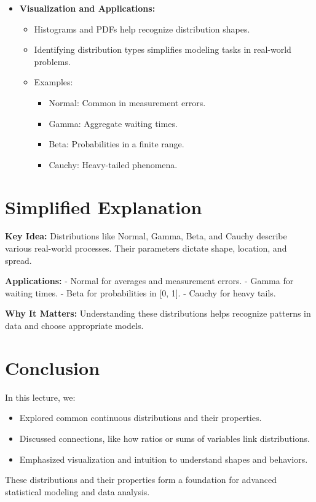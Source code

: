 \documentclass{article}
\begin{document}
\begin{itemize}
  \item \textbf{Visualization and Applications:}
    \begin{itemize}
      \item Histograms and PDFs help recognize distribution shapes.
      \item Identifying distribution types simplifies modeling tasks in real-world problems.
      \item Examples:
        \begin{itemize}
          \item Normal: Common in measurement errors.
          \item Gamma: Aggregate waiting times.
          \item Beta: Probabilities in a finite range.
          \item Cauchy: Heavy-tailed phenomena.
        \end{itemize}
    \end{itemize}
\end{itemize}

\section*{Simplified Explanation}

\textbf{Key Idea:}
Distributions like Normal, Gamma, Beta, and Cauchy describe various real-world processes. Their parameters dictate shape, location, and spread.

\textbf{Applications:}
- Normal for averages and measurement errors.
- Gamma for waiting times.
- Beta for probabilities in [0, 1].
- Cauchy for heavy tails.

\textbf{Why It Matters:}
Understanding these distributions helps recognize patterns in data and choose appropriate models.

\section*{Conclusion}

In this lecture, we:
\begin{itemize}
  \item Explored common continuous distributions and their properties.
  \item Discussed connections, like how ratios or sums of variables link distributions.
  \item Emphasized visualization and intuition to understand shapes and behaviors.
\end{itemize}

These distributions and their properties form a foundation for advanced statistical modeling and data analysis.
\end{document}
